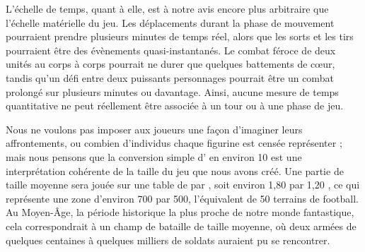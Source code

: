 L'échelle de temps, quant à elle, est à notre avis encore plus arbitraire que l'échelle matérielle du jeu. Les déplacements durant la phase de mouvement pourraient prendre plusieurs minutes de temps réel, alors que les sorts et les tirs pourraient être des évènements quasi-instantanés. Le combat féroce de deux unités au corps à corps pourrait ne durer que quelques battements de cœur, tandis qu'un défi entre deux puissants personnages pourrait être un combat prolongé sur plusieurs minutes ou davantage. Ainsi, aucune mesure de temps quantitative ne peut réellement être associée à un tour ou à une phase de jeu.

Nous ne voulons pas imposer aux joueurs une façon d'imaginer leurs affrontements, ou combien d'individus chaque figurine est censée représenter ; mais nous pensons que la conversion simple d' en environ \unit{10}{\meter} est une interprétation cohérente de la taille du jeu que nous avons créé. Une partie de taille moyenne sera jouée sur une table de  par , soit environ 1,80 {\meter} par 1,20 {\meter}, ce qui représente une zone d'environ \unit{700}{\meter} par \unit{500}{\meter}, l'équivalent de 50 terrains de football. Au Moyen-Âge, la période historique la plus proche de notre monde fantastique, cela correspondrait à un champ de bataille de taille moyenne, où deux armées de quelques centaines à quelques milliers de soldats auraient pu se rencontrer.
